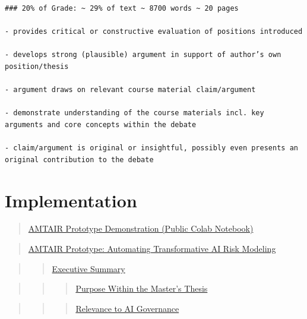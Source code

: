 \documentclass[
  letterpaper,
]{book}
\begin{document}
\begin{verbatim}
### 20% of Grade: ~ 29% of text ~ 8700 words ~ 20 pages

- provides critical or constructive evaluation of positions introduced

- develops strong (plausible) argument in support of author’s own position/thesis

- argument draws on relevant course material claim/argument

- demonstrate understanding of the course materials incl. key arguments and core concepts within the debate

- claim/argument is original or insightful, possibly even presents an original contribution to the debate 
\end{verbatim}

\section{Implementation}\label{implementation}

\begin{quote}
\hyperref[scrollTo=lt8-AnebGUXr]{AMTAIR Prototype Demonstration (Public
Colab Notebook)}
\end{quote}

\begin{quote}
\hyperref[scrollTo=iDy_leH6DJH_]{AMTAIR Prototype: Automating
Transformative AI Risk Modeling}
\end{quote}

\begin{quote}
\begin{quote}
\hyperref[scrollTo=iDy_leH6DJH_]{Executive Summary}
\end{quote}
\end{quote}

\begin{quote}
\begin{quote}
\begin{quote}
\hyperref[scrollTo=iDy_leH6DJH_]{Purpose Within the Master's Thesis}
\end{quote}
\end{quote}
\end{quote}

\begin{quote}
\begin{quote}
\begin{quote}
\hyperref[scrollTo=iDy_leH6DJH_]{Relevance to AI Governance}
\end{quote}
\end{quote}
\end{quote}
\end{document}
